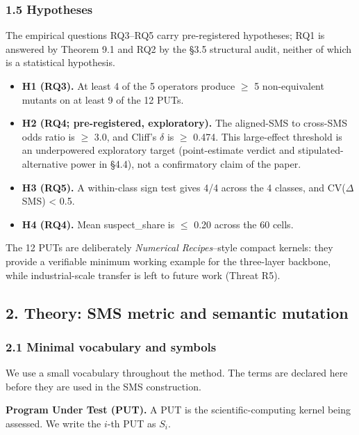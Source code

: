 \documentclass[review,12pt,authoryear]{elsarticle}
\providecommand{\tightlist}{\setlength{\itemsep}{0pt}\setlength{\parskip}{0pt}}
\begin{document}
\subsubsection{1.5 Hypotheses}\label{hypotheses}

The empirical questions RQ3--RQ5 carry pre-registered hypotheses; RQ1 is
answered by Theorem 9.1 and RQ2 by the §3.5 structural audit, neither of
which is a statistical hypothesis.

\begin{itemize}
\tightlist
\item
  \textbf{H1 (RQ3).} At least 4 of the 5 operators produce $\geq$ 5 non-equivalent
  mutants on at least 9 of the 12 PUTs.
\item
  \textbf{H2 (RQ4; pre-registered, exploratory).} The aligned-SMS to
  cross-SMS odds ratio is $\geq$ 3.0, and Cliff's $\delta$ is $\geq$ 0.474.
  This large-effect threshold is an underpowered exploratory target
  (point-estimate verdict and stipulated-alternative power in §4.4), not
  a confirmatory claim of the paper.
\item
  \textbf{H3 (RQ5).} A within-class sign test gives 4/4 across the 4 classes,
  and CV($\Delta$SMS) \textless{} 0.5.
\item
  \textbf{H4 (RQ4).} Mean suspect\_share is $\leq$ 0.20 across the 60 cells.
\end{itemize}

The 12 PUTs are deliberately \emph{Numerical Recipes}--style compact
kernels: they provide a verifiable minimum working example for the
three-layer backbone, while industrial-scale transfer is left to future
work (Threat R5).


\subsection{2. Theory: SMS metric and semantic mutation}\label{notation-and-equivalence-judgement}

\subsubsection{2.1 Minimal vocabulary and symbols}\label{vocabulary-inheritance}

We use a small vocabulary throughout the method. The terms are declared
here before they are used in the SMS construction.

\textbf{Program Under Test (PUT).} A PUT is the scientific-computing
kernel being assessed. We write the \(i\)-th PUT as \(S_i\).
\end{document}

